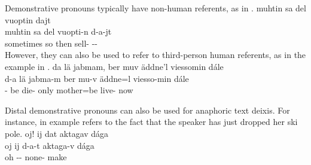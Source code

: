 Demonstrative pronouns typically have non-human referents, as in . 
\ea\label{demProWithNonHumanReferent1}%
\glll	muhtin sa del vuoptin dajt\\
	muhtin sa del vuopti-n d-a-jt\\
	sometimes so then sell- --\\\nopagebreak
{}	
\z
However, they can also be used to refer to third-person human referents, as in the example in . 
\ea\label{demProWithHumanReferent1}
\glll	da lä jabmam, ber muv äddne'l viessomin dále\\
	d-a lä jabma-m ber mu-v äddne=l viesso-min dále\\
	-\BS{} be\BS{} die- only  mother\BS{}=be\BS{} live- now\\\nopagebreak
{}	
\z

Distal demonstrative pronouns can also be used for anaphoric text deixis. For instance,  in example  refers to the fact that the speaker has just dropped her ski pole. 
\ea\label{demProTextDeixis}%
\glll	oj! ij dat aktagav dága\\
	oj ij d-a-t aktaga-v dága\\
	oh \BS{} -- none- make\BS{}\\\nopagebreak
{}	
\z

